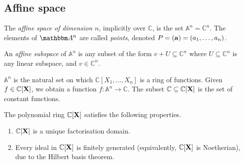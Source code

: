 \subsection{Affine space}
\begin{definition}
    The \emph{affine space of dimension \( n \)}, implicitly over \( \mathbb C \), is the set \( \mathbb A^n = \mathbb C^n \).
    The elements of \( \mathbbm A^n \) are called \emph{points}, denoted \( P = (\vb a) = (a_1, \dots, a_n) \).
\end{definition}
\begin{definition}
    An \emph{affine subspace} of \( \mathbb A^n \) is any subset of the form \( v + U \subseteq \mathbb C^n \) where \( U \subseteq \mathbb C^n \) is any linear subspace, and \( v \in \mathbb C^n \).
\end{definition}
\( \mathbb A^n \) is the natural set on which \( \mathbb C[X_1, \dots, X_n] \) is a ring of functions.
Given \( f \in \mathbb C[\vb X] \), we obtain a function \( f \colon \mathbb A^n \to \mathbb C \).
The subset \( \mathbb C \subseteq \mathbb C[\vb X] \) is the set of constant functions.
\begin{proposition}
    The polynomial ring \( \mathbb C[\vb X] \) satisfies the following properties.
    \begin{enumerate}
        \item \( \mathbb C[\vb X] \) is a unique factorisation domain.
        \item Every ideal in \( \mathbb C[\vb X] \) is finitely generated (equivalently, \( \mathbb C[\vb X] \) is Noetherian), due to the Hilbert basis theorem.
    \end{enumerate}
\end{proposition}

